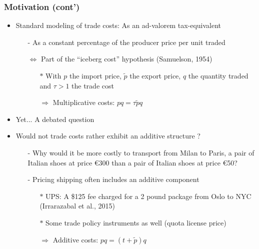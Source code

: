 \documentclass[10 pt,Helvetica, french]{beamer}
\begin{document}
\begin{frame}
\frametitle{Motivation (cont')}
\begin{itemize}
\item Standard modeling of trade costs: As an ad-valorem tax-equivalent \vspace{0.1cm}
\begin{itemize}
\item[-] As a constant percentage of the producer price per unit traded \vspace{0.1cm}
\item[$\Leftrightarrow$] Part of the ``iceberg cost'' hypothesis (Samuelson, 1954) \vspace{0.1cm}
\begin{itemize}
\item[$\ast$] With $p$ the import price, $\widetilde{p}$ the export price, $q$ the quantity traded and $\tau >1$ the trade cost \vspace{0.1cm}
\item[$\Rightarrow$] Multiplicative costs:     \footnotesize $pq = \tau \widetilde{p}q$
\normalsize
\end{itemize}
\end{itemize}
\item Yet... A debated question \vspace{0.1cm}
\item Would not trade costs rather exhibit an additive structure ?  \vspace{0.1cm} \vspace{0.1cm}
\begin{itemize}
\item[-] Why would it be more costly to transport from Milan to Paris, a pair of Italian shoes at price \euro 300 than a pair of Italian shoes at price \euro 50? \vspace{0.1cm}
\item[-] Pricing shipping often includes an additive component \vspace{0.1cm}
\begin{itemize}
\item[$\ast$] UPS: A \$125 fee charged for a 2 pound package from Oslo to NYC (Irrarazabal et al., 2015) \vspace{0.1cm}
\item[$\ast$] Some trade policy instruments as well (quota license price) \vspace{0.1cm}
\item[$\Rightarrow$] Additive costs: \footnotesize $pq = (t+\widetilde{p})q  $
\end{itemize}
\end{itemize}
\end{itemize}
\end{frame}
\end{document}
